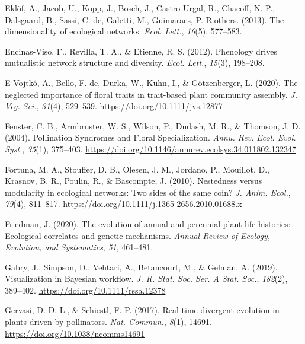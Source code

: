 \documentclass[
  12pt,
  a4paper,
]{article}
\newlength{\cslhangindent}
\newlength{\cslentryspacingunit} %
\newenvironment{CSLReferences}[2] %
 {%
  \setlength{\parindent}{0pt}
  \ifodd #1
  \let\oldpar\par
  \def\par{\hangindent=\cslhangindent\oldpar}
  \fi
  \setlength{\parskip}{#2\cslentryspacingunit}
 }%
 {}
\begin{document}
\begin{CSLReferences}{1}{0}
\leavevmode{}%
Eklöf, A., Jacob, U., Kopp, J., Bosch, J., Castro-Urgal, R., Chacoff, N. P., Dalsgaard, B., Sassi, C. de, Galetti, M., Guimaraes, P. R.others. (2013). The dimensionality of ecological networks. \emph{Ecol. Lett.}, \emph{16}(5), 577--583.

\leavevmode{}%
Encinas-Viso, F., Revilla, T. A., \& Etienne, R. S. (2012). Phenology drives mutualistic network structure and diversity. \emph{Ecol. Lett.}, \emph{15}(3), 198--208.

\leavevmode{}%
E-Vojtkó, A., Bello, F. de, Durka, W., Kühn, I., \& Götzenberger, L. (2020). The neglected importance of floral traits in trait-based plant community assembly. \emph{J. Veg. Sci.}, \emph{31}(4), 529--539. \url{https://doi.org/10.1111/jvs.12877}

\leavevmode{}%
Fenster, C. B., Armbruster, W. S., Wilson, P., Dudash, M. R., \& Thomson, J. D. (2004). Pollination {Syndromes} and {Floral Specialization}. \emph{Annu. Rev. Ecol. Evol. Syst.}, \emph{35}(1), 375--403. \url{https://doi.org/10.1146/annurev.ecolsys.34.011802.132347}

\leavevmode{}%
Fortuna, M. A., Stouffer, D. B., Olesen, J. M., Jordano, P., Mouillot, D., Krasnov, B. R., Poulin, R., \& Bascompte, J. (2010). Nestedness versus modularity in ecological networks: Two sides of the same coin? \emph{J. Anim. Ecol.}, \emph{79}(4), 811--817. \url{https://doi.org/10.1111/j.1365-2656.2010.01688.x}

\leavevmode{}%
Friedman, J. (2020). The evolution of annual and perennial plant life histories: Ecological correlates and genetic mechanisms. \emph{Annual Review of Ecology, Evolution, and Systematics}, \emph{51}, 461--481.

\leavevmode{}%
Gabry, J., Simpson, D., Vehtari, A., Betancourt, M., \& Gelman, A. (2019). Visualization in {Bayesian} workflow. \emph{J. R. Stat. Soc. Ser. A Stat. Soc.}, \emph{182}(2), 389--402. \url{https://doi.org/10.1111/rssa.12378}

\leavevmode{}%
Gervasi, D. D. L., \& Schiestl, F. P. (2017). Real-time divergent evolution in plants driven by pollinators. \emph{Nat. Commun.}, \emph{8}(1), 14691. \url{https://doi.org/10.1038/ncomms14691}


\end{CSLReferences}
\end{document}

